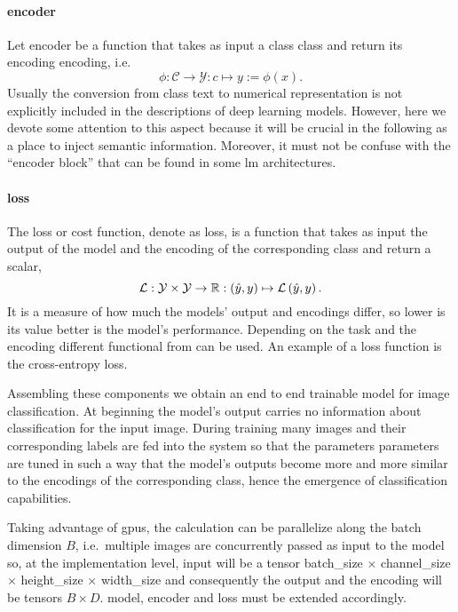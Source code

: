 \paragraph{encoder} Let \gls{encoder} be a function that takes as input a class \gls{class} and return its encoding \gls{encoding}, i.e.\
\begin{equation}
  \phi: \mathcal{C} \to \mathcal{Y} : c \mapsto y := \phi \left(x\right).
  \label{eq:encoder}
\end{equation}
Usually the conversion from class text to numerical representation is not explicitly included in the descriptions of deep learning models. However, here we devote some attention to this aspect because it will be crucial in the following as a place to inject semantic information. Moreover, it must not be confuse with the ``encoder block'' that can be found in some \acrshort{lm} architectures.

\paragraph{loss} The loss or cost function, denote as \gls{loss}, is a function that takes as input the output of the model and the encoding of the corresponding class and return a scalar,
\begin{equation}
  \operatorname{\mathcal{L}}: \mathcal{Y} \times \mathcal{Y} \to \mathbb{R}
       : \left(\hat{y}, y\right) \mapsto \operatorname{\mathcal{L}} \left(\hat{y}, y\right).
  \label{eq:loss}
\end{equation}
It is a measure of how much the models' output and encodings differ, so lower is its value better is the model's performance. Depending on the task and the encoding different functional from can be used. An example of a loss function is the cross-entropy loss.

\medskip Assembling these components we obtain an end to end trainable model for image classification. At beginning the model's output carries no information about classification for the input image. During training many images and their corresponding labels are fed into the system so that the parameters \gls{parameters} are tuned in such a way that the model's outputs become more and more similar to the encodings of the corresponding class, hence the emergence of classification capabilities.

Taking advantage of \acrshort{gpu}s, the calculation can be parallelize along the batch dimension $B$, i.e.\ multiple images are concurrently passed as input to the model so, at the implementation level, \gls{input} will be a tensor \gls{batch_size} $\times$ \gls{channel_size} $\times$ \gls{height_size} $\times$ \gls{width_size} and consequently the output and the encoding will be tensors $B \times D$. \gls{model}, \gls{encoder} and \gls{loss} must be extended accordingly.


